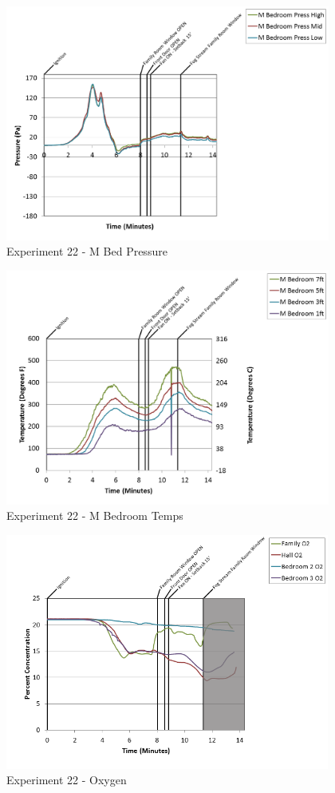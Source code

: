\documentclass{article}
\begin{document}
\begin{appendices}
\begin{figure}[h!]
	\centering
	\includegraphics[height=3.05in]{0_Images/Results_Charts/Exp_22_Charts/MBedPressure.png}
	\caption{Experiment 22 - M Bed Pressure}
\end{figure}

\clearpage

\begin{figure}[h!]
	\centering
	\includegraphics[height=3.05in]{0_Images/Results_Charts/Exp_22_Charts/MBedroomTemps.png}
	\caption{Experiment 22 - M Bedroom Temps}
\end{figure}


\begin{figure}[h!]
	\centering
	\includegraphics[height=3.05in]{0_Images/Results_Charts/Exp_22_Charts/Oxygen.png}
	\caption{Experiment 22 - Oxygen}
\end{figure}


\end{appendices}
\end{document}
